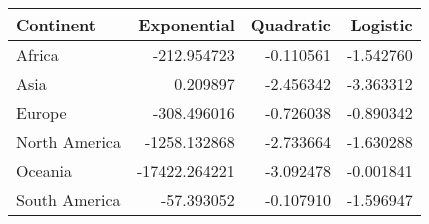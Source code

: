 \begin{tabular}{lrrr}
\toprule
     Continent &   Exponential &  Quadratic &  Logistic \\
\midrule
        Africa &   -212.954723 &  -0.110561 & -1.542760 \\
          Asia &      0.209897 &  -2.456342 & -3.363312 \\
        Europe &   -308.496016 &  -0.726038 & -0.890342 \\
 North America &  -1258.132868 &  -2.733664 & -1.630288 \\
       Oceania & -17422.264221 &  -3.092478 & -0.001841 \\
 South America &    -57.393052 &  -0.107910 & -1.596947 \\
\bottomrule
\end{tabular}

